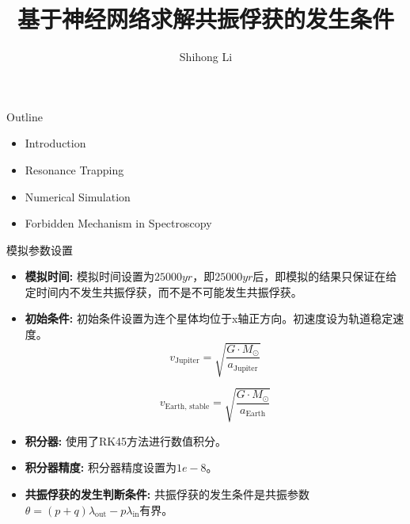 \documentclass{beamer}		%
\date{}	%
\title[Resonance trapping]{基于神经网络求解共振俘获的发生条件}	%
\author[S Li]{Shihong Li} %
\institute[ZJU]{Zhejiang University} %
\begin{document}


\begin{frame}	

\titlepage	%
	
\end{frame}		


\begin{frame}{Outline}	%
    \begin{itemize}
        \item Introduction
        \item Resonance Trapping
        \item Numerical Simulation
        \item Forbidden Mechanism in Spectroscopy
    \end{itemize}
\end{frame}

\begin{frame}{模拟参数设置}
    \begin{itemize}
        \item \textbf{模拟时间:} 模拟时间设置为$25000yr$，即$25000yr$后，即模拟的结果只保证在给定时间内不发生共振俘获，而不是不可能发生共振俘获。
        \item \textbf{初始条件:} 初始条件设置为连个星体均位于x轴正方向。初速度设为轨道稳定速度。%
        \[v_{\text{Jupiter}} = \sqrt{\frac{G \cdot M_{\odot}}{a_{\text{Jupiter}}}}\]
        
        \[v_{\text{Earth, stable}} = \sqrt{\frac{G \cdot M_{\odot}}{a_{\text{Earth}}}}\]
        
        \item \textbf{积分器:} 使用了RK45方法进行数值积分。
        \item \textbf{积分器精度:} 积分器精度设置为$1e-8$。
        \item \textbf{共振俘获的发生判断条件:} 共振俘获的发生条件是共振参数$\theta=(p+q)\lambda_\mathrm{out}-p\lambda_\mathrm{in}$有界。

    \end{itemize}
\end{frame}
\end{document}

